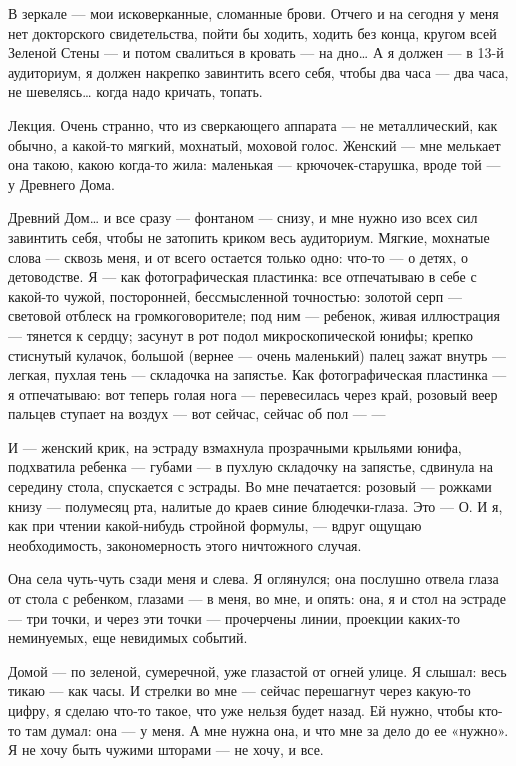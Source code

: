 \documentclass[11pt,openany]{book}
\begin{document}
В зеркале --- мои исковерканные, сломанные брови. Отчего и на сегодня у меня нет докторского свидетельства, пойти бы ходить, ходить без конца, кругом всей Зеленой Стены --- и потом свалиться в кровать --- на дно\ldots{} А я должен --- в 13-й аудиториум, я должен накрепко завинтить всего себя, чтобы два часа --- два часа, не шевелясь\ldots{} когда надо кричать, топать.

Лекция. Очень странно, что из сверкающего аппарата --- не металлический, как обычно, а какой-то мягкий, мохнатый, моховой голос. Женский --- мне мелькает она такою, какою когда-то жила: маленькая --- крючочек-старушка, вроде той --- у Древнего Дома.

Древний Дом\ldots{} и все сразу --- фонтаном --- снизу, и мне нужно изо всех сил завинтить себя, чтобы не затопить криком весь аудиториум. Мягкие, мохнатые слова --- сквозь меня, и от всего остается только одно: что-то --- о детях, о детоводстве. Я --- как фотографическая пластинка: все отпечатываю в себе с какой-то чужой, посторонней, бессмысленной точностью: золотой серп --- световой отблеск на громкоговорителе; под ним --- ребенок, живая иллюстрация --- тянется к сердцу; засунут в рот подол микроскопической юнифы; крепко стиснутый кулачок, большой (вернее --- очень маленький) палец зажат внутрь --- легкая, пухлая тень --- складочка на запястье. Как фотографическая пластинка --- я отпечатываю: вот теперь голая нога --- перевесилась через край, розовый веер пальцев ступает на воздух --- вот сейчас, сейчас об пол --- ---

И --- женский крик, на эстраду взмахнула прозрачными крыльями юнифа, подхватила ребенка --- губами --- в пухлую складочку на запястье, сдвинула на середину стола, спускается с эстрады. Во мне печатается: розовый --- рожками книзу --- полумесяц рта, налитые до краев синие блюдечки-глаза. Это --- О. И я, как при чтении какой-нибудь стройной формулы, --- вдруг ощущаю необходимость, закономерность этого ничтожного случая.

Она села чуть-чуть сзади меня и слева. Я оглянулся; она послушно отвела глаза от стола с ребенком, глазами --- в меня, во мне, и опять: она, я и стол на эстраде --- три точки, и через эти точки --- прочерчены линии, проекции каких-то неминуемых, еще невидимых событий.

Домой --- по зеленой, сумеречной, уже глазастой от огней улице. Я слышал: весь тикаю --- как часы. И стрелки во мне --- сейчас перешагнут через какую-то цифру, я сделаю что-то такое, что уже нельзя будет назад. Ей нужно, чтобы кто-то там думал: она --- у меня. А мне нужна она, и что мне за дело до ее «нужно». Я не хочу быть чужими шторами --- не хочу, и все.
\end{document}
